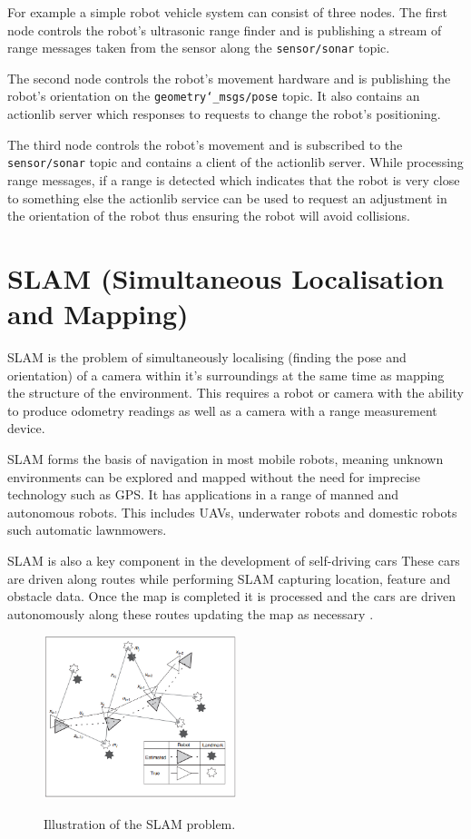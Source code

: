 \documentclass{mproj}
\begin{document}
For example a simple robot vehicle system can consist of three nodes. The first node controls the robot's ultrasonic range finder and is publishing a stream of range messages taken from the sensor along the \texttt{sensor/sonar} topic.

The second node controls the robot's movement hardware and is publishing the robot's orientation on the \texttt{geometry\char`_msgs/pose} topic. It also contains an actionlib server which responses to requests to change the robot's positioning. 

The third node controls the robot's movement and is subscribed to the \texttt{sensor/sonar} topic and contains a client of the actionlib server. While processing range messages, if a range is detected which indicates that the robot is very close to something else the actionlib service can be used to request an adjustment in the orientation of the robot thus ensuring the robot will avoid collisions. 



\section{SLAM (Simultaneous Localisation and Mapping)}

SLAM is the problem of simultaneously localising (finding the pose and orientation) of a camera within it's surroundings at the same time as mapping the structure of the environment. This requires a robot or camera with the ability to produce odometry readings as well as a camera with a range measurement device.

SLAM forms the basis of navigation in most mobile robots, meaning unknown environments can be explored and mapped without the need for imprecise technology such as GPS. It has applications in a range of manned and autonomous robots. This includes UAVs, underwater robots and domestic robots such automatic lawnmowers. 

SLAM is also a key component in the development of self-driving cars These cars are driven along routes while performing SLAM capturing location, feature and obstacle data. Once the map is completed it is processed and the cars are driven autonomously along these routes updating the map as necessary \cite{cars}.


\begin{figure}[h]
  \caption{Illustration of the SLAM problem.}
  \centering
  \includegraphics[width=0.5\textwidth]{images/slam_problem.png}
  \label{fig:SLAM Problem}
\end{figure}
\end{document}
